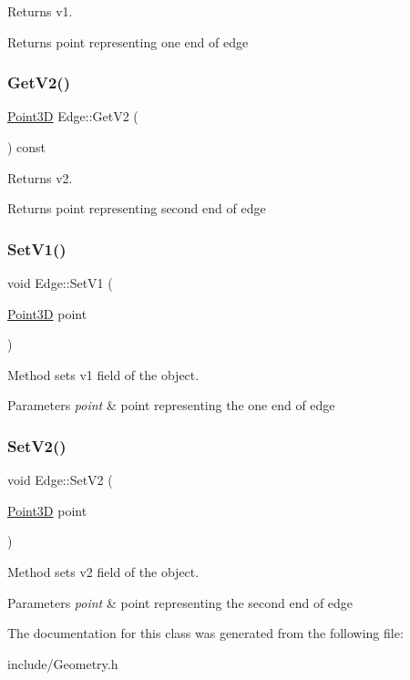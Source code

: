 Returns v1. \begin{DoxyReturn}{Returns}
point representing one end of edge 
\end{DoxyReturn}
\hypertarget{class_edge_a9be2780962afac8b55848ea1df3a28e9}{}\label{class_edge_a9be2780962afac8b55848ea1df3a28e9} 
\subsubsection{\texorpdfstring{Get\+V2()}{GetV2()}}
{\footnotesize\ttfamily \hyperlink{class_point3_d}{Point3D} Edge\+::\+Get\+V2 (\begin{DoxyParamCaption}{ }\end{DoxyParamCaption}) const}

Returns v2. \begin{DoxyReturn}{Returns}
point representing second end of edge 
\end{DoxyReturn}
\hypertarget{class_edge_a3c7909c0d93258c05e61fb1704c699ec}{}\label{class_edge_a3c7909c0d93258c05e61fb1704c699ec} 
\subsubsection{\texorpdfstring{Set\+V1()}{SetV1()}}
{\footnotesize\ttfamily void Edge\+::\+Set\+V1 (\begin{DoxyParamCaption}\item[{\hyperlink{class_point3_d}{Point3D}}]{point }\end{DoxyParamCaption})}

Method sets v1 field of the object. 
\begin{DoxyParams}{Parameters}
{\em point} & point representing the one end of edge \\
\hline
\end{DoxyParams}
\hypertarget{class_edge_af89cb05e0c7d9cbf31330e445a5d0752}{}\label{class_edge_af89cb05e0c7d9cbf31330e445a5d0752} 
\subsubsection{\texorpdfstring{Set\+V2()}{SetV2()}}
{\footnotesize\ttfamily void Edge\+::\+Set\+V2 (\begin{DoxyParamCaption}\item[{\hyperlink{class_point3_d}{Point3D}}]{point }\end{DoxyParamCaption})}

Method sets v2 field of the object. 
\begin{DoxyParams}{Parameters}
{\em point} & point representing the second end of edge \\
\hline
\end{DoxyParams}


The documentation for this class was generated from the following file\+:\begin{DoxyCompactItemize}
\item 
include/Geometry.\+h\end{DoxyCompactItemize}
